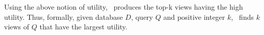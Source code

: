 Using the above notion of utility, \SeeDB\ produces the top-k views having the
high utility. Thus, formally, given database $D$, query $Q$ and positive integer
$k$, \SeeDB\ finds $k$ views of $Q$ that have the largest utility. 

